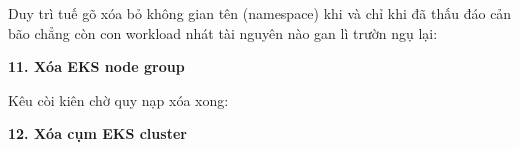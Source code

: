 Duy trì tuế gõ xóa bỏ không gian tên (namespace) khi và chỉ khi đã thấu
đáo cản bão chẳng còn con workload nhát tài nguyên nào gan lì trườn ngụ
lại:

\begin{Shaded}
\begin{Highlighting}[]
\end{Highlighting}
\end{Shaded}

\vspace{0.5em}\noindent\textbf{11. Xóa EKS node group}\par

\begin{Shaded}
\begin{Highlighting}[]
\DataTypeTok{\textbackslash{}}
  \DataTypeTok{\textbackslash{}}

\DataTypeTok{\textbackslash{}}
  \DataTypeTok{\textbackslash{}}
   \OperatorTok{\textless{}}\OperatorTok{\textgreater{}} \DataTypeTok{\textbackslash{}}
\end{Highlighting}
\end{Shaded}

Kêu còi kiên chờ quy nạp xóa xong:

\begin{Shaded}
\begin{Highlighting}[]
\DataTypeTok{\textbackslash{}}
  \DataTypeTok{\textbackslash{}}
   \OperatorTok{\textless{}}\OperatorTok{\textgreater{}} \DataTypeTok{\textbackslash{}}
\end{Highlighting}
\end{Shaded}

\vspace{0.5em}\noindent\textbf{12. Xóa cụm EKS
cluster}\par

